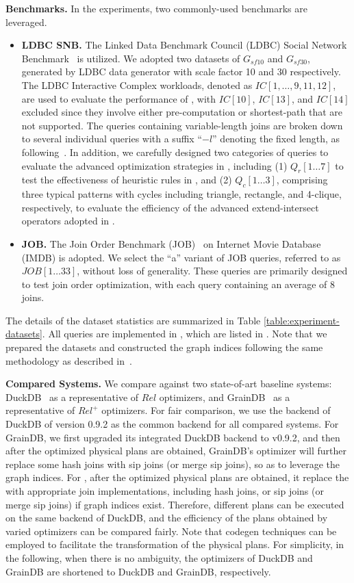 \noindent\textbf{Benchmarks.} In the experiments, two commonly-used benchmarks are leveraged.
\begin{itemize}
    \item \textbf{LDBC SNB.} The Linked Data Benchmark Council (LDBC) Social Network Benchmark~\cite{ldbc_snb} is utilized. We adopted two datasets of $G_{sf10}$ and $G_{sf30}$, generated by LDBC data generator with scale factor 10 and 30 respectively.
    The LDBC Interactive Complex workloads, denoted as  $IC[1, \ldots, 9, 11, 12]$, are used to evaluate the performance of \relgo, with $IC[10]$, $IC[13]$, and $IC[14]$ excluded since they involve either pre-computation or shortest-path that are not supported.
    The queries containing variable-length joins are broken down to several individual queries with a suffix ``$-l$'' denoting the fixed length, as following~\cite{graindb}.
    In addition, we carefully designed two categories of queries to evaluate the advanced optimization strategies in \relgo, including (1) $Q_r[1\ldots 7]$ to test the effectiveness of heuristic rules in \relgo, and (2) $Q_c[1\ldots 3]$, comprising three typical patterns with cycles including triangle, rectangle, and 4-clique, respectively, to evaluate the efficiency of the advanced extend-intersect operators adopted in \relgo.
    \item \textbf{JOB.} The Join Order Benchmark (JOB)~\cite{job_snb} on Internet Movie Database (IMDB) is adopted. We select the ``a'' variant of JOB queries, referred to as $JOB[1\ldots 33]$, without loss of generality. These queries are primarily designed to test join order optimization, with each query containing an average of $8$ joins.
\end{itemize}
The details of the dataset statistics are summarized in Table \ref{table:experiment-datasets}.
All queries are implemented in , which are listed in .
Note that we prepared the datasets and constructed the graph indices following the same methodology as described in~\cite{graindb}.

\noindent\textbf{Compared Systems. }
We compare \relgo against two state-of-art baseline systems: DuckDB~\cite{duckdb} as a representative of $Rel$ optimizers, and GrainDB~\cite{graindb} as a representative of $Rel^+$ optimizers.
For fair comparison, we use the backend of DuckDB of version 0.9.2 as the common backend for all compared systems. 
For GrainDB, we first upgraded its integrated DuckDB backend to v0.9.2, and then after the optimized physical plans are obtained, GrainDB's optimizer will further replace some hash joins with sip joins (or merge sip joins), so as to leverage the graph indices.
For \relgo, after the optimized physical plans are obtained, it replace the  with appropriate join implementations, including hash joins, or sip joins (or merge sip joins) if graph indices exist.
Therefore, different plans can be executed on the same backend of DuckDB, and the efficiency of the plans obtained by varied optimizers can be compared fairly.
Note that codegen techniques can be employed to facilitate the transformation of the physical plans.
For simplicity, in the following, when there is no ambiguity, the optimizers of DuckDB and GrainDB are shortened to DuckDB and GrainDB, respectively.

